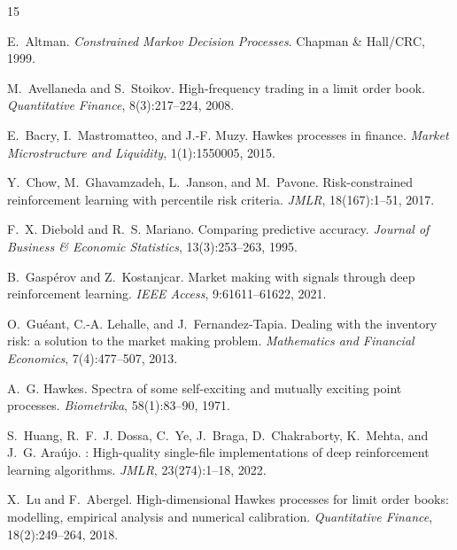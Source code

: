 \documentclass[11pt,twocolumn]{article}
\begin{document}
\begin{thebibliography}{15}

E.~Altman.
\newblock \emph{Constrained Markov Decision Processes}.
\newblock Chapman \& Hall/CRC, 1999.

M.~Avellaneda and S.~Stoikov.
\newblock High-frequency trading in a limit order book.
\newblock \emph{Quantitative Finance}, 8(3):217--224, 2008.

E.~Bacry, I.~Mastromatteo, and J.-F. Muzy.
\newblock Hawkes processes in finance.
\newblock \emph{Market Microstructure and Liquidity}, 1(1):1550005, 2015.

Y.~Chow, M.~Ghavamzadeh, L.~Janson, and M.~Pavone.
\newblock Risk-constrained reinforcement learning with percentile risk
  criteria.
\newblock \emph{JMLR}, 18(167):1--51, 2017.

F.~X. Diebold and R.~S. Mariano.
\newblock Comparing predictive accuracy.
\newblock \emph{Journal of Business \& Economic Statistics}, 13(3):253--263,
  1995.

B.~Gasp\'{e}rov and Z.~Kostanjcar.
\newblock Market making with signals through deep reinforcement learning.
\newblock \emph{IEEE Access}, 9:61611--61622, 2021.

O.~Gu\'{e}ant, C.-A. Lehalle, and J.~Fernandez-Tapia.
\newblock Dealing with the inventory risk: a solution to the market making
  problem.
\newblock \emph{Mathematics and Financial Economics}, 7(4):477--507, 2013.

A.~G. Hawkes.
\newblock Spectra of some self-exciting and mutually exciting point processes.
\newblock \emph{Biometrika}, 58(1):83--90, 1971.

S.~Huang, R.~F.~J. Dossa, C.~Ye, J.~Braga, D.~Chakraborty, K.~Mehta, and
  J.~G. Ara\'{u}jo.
: High-quality single-file implementations of deep
  reinforcement learning algorithms.
\newblock \emph{JMLR}, 23(274):1--18, 2022.

X.~Lu and F.~Abergel.
\newblock High-dimensional Hawkes processes for limit order books: modelling,
  empirical analysis and numerical calibration.
\newblock \emph{Quantitative Finance}, 18(2):249--264, 2018.


\end{thebibliography}
\end{document}
